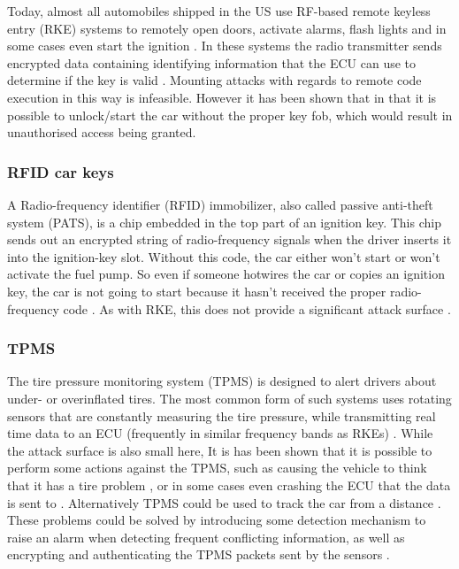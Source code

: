Today, almost all automobiles shipped in the US use RF-based remote keyless entry (RKE) systems to remotely open doors, activate alarms, flash lights and in some cases even start the ignition \cite{Kosher}. In these systems the radio transmitter sends encrypted data containing identifying information that the ECU can use to determine if the key is valid \cite{MillerA}. Mounting attacks with regards to remote code execution in this way is infeasible. However it has been shown that in \cite{KeeLoq} that it is possible to unlock/start the car without the proper key fob, which would result in unauthorised access being granted.

\subsubsection{RFID car keys}
\label{subsubsec:rfid} 

A Radio-frequency identifier (RFID) immobilizer, also called passive anti-theft system (PATS), is a chip embedded in the top part of an ignition key. This chip sends out an encrypted string of radio-frequency signals when the driver inserts it into the ignition-key slot. Without this code, the car either won't start or won't activate the fuel pump. So even if someone hotwires the car or copies an ignition key, the car is not going to start because it hasn't received the proper radio-frequency code \cite{RFID}. As with RKE, this does not provide a significant attack surface \cite{MillerA}.

\subsubsection{TPMS} 
\label{subsubsec:tpms}

The tire pressure monitoring system (TPMS) is designed to alert drivers about under- or overinflated tires. The most common form of such systems uses rotating sensors that are constantly measuring the tire pressure, while transmitting real time data to an ECU (frequently in similar frequency bands as RKEs) \cite{Kosher}. While the attack surface is also small here, It is has been shown that it is possible to perform some actions against the TPMS, such as causing the vehicle to think that it has a tire problem \cite{TPMS}, or in some cases even crashing the ECU that the data is sent to \cite{MillerA}. Alternatively TPMS could be used to track the car from a distance \cite{TPMS}. These problems could be solved by introducing some detection mechanism to raise an alarm when detecting frequent conflicting information, as well as encrypting and authenticating the TPMS packets sent by the sensors \cite{TPMS}.

